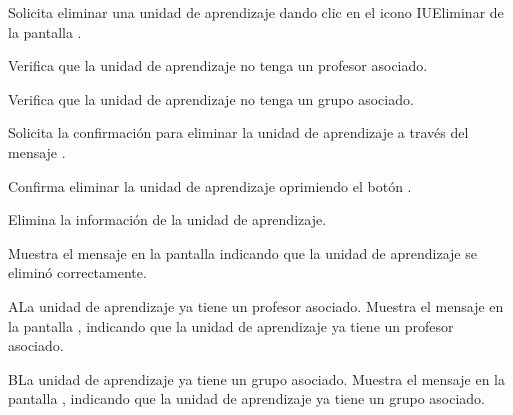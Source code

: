 \begin{UCtrayectoria}
	\UCpaso [\UCactor] Solicita eliminar una unidad de aprendizaje dando clic en el icono IUEliminar de la pantalla .
	
	\UCpaso [\UCsist] Verifica que la unidad de aprendizaje no tenga un profesor asociado. 
	
	\UCpaso [\UCsist] Verifica que la unidad de aprendizaje no tenga un grupo asociado. 
		
	\UCpaso [\UCsist] Solicita la confirmación para eliminar la unidad de aprendizaje a través del mensaje .
	
	\UCpaso [\UCactor] Confirma eliminar la unidad de aprendizaje oprimiendo el botón .
	
	\UCpaso [\UCsist] Elimina la información de la unidad de aprendizaje.
	
	\UCpaso [\UCsist] Muestra el mensaje  en la pantalla  indicando que la unidad de aprendizaje se eliminó correctamente.	
	
\end{UCtrayectoria}

\begin{UCtrayectoriaA}{A}{La unidad de aprendizaje ya tiene un profesor asociado.}
	\UCpaso [\UCsist] Muestra el mensaje  en la pantalla , indicando que la unidad de aprendizaje ya tiene un profesor asociado. 
\end{UCtrayectoriaA}

\begin{UCtrayectoriaA}{B}{La unidad de aprendizaje ya tiene un grupo asociado.}
	\UCpaso [\UCsist] Muestra el mensaje  en la pantalla , indicando que la unidad de aprendizaje ya tiene un grupo asociado. 
\end{UCtrayectoriaA}
